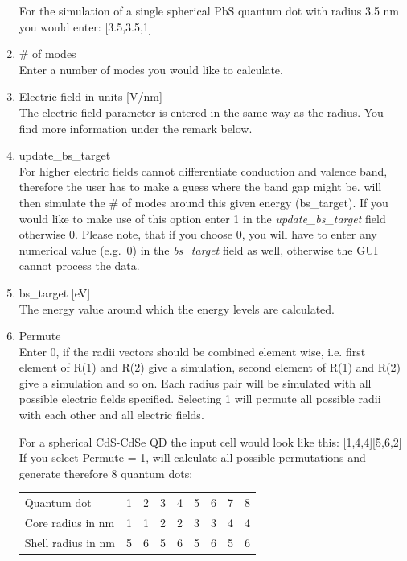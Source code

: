 \begin{enumerate}
							\begin{EXAMPLE}
								For the simulation of a single spherical PbS quantum dot with radius 3.5 nm you would enter: [3.5,3.5,1]
							\end{EXAMPLE}
				\item \# of modes	\\
							Enter a number of modes you would like to calculate.
				\item Electric field in units [V/nm]			\\
							The electric field parameter is entered in the same way as the radius. You find more information under the remark below.
				\item update\_bs\_target	\\
							For higher electric fields \omen cannot differentiate conduction and valence band, therefore the user has to make a guess
							where the band gap might be. \omen will then simulate the \# of modes around this given energy (bs\_target).
							If you would like to make use of this option enter 1 in the {\it update\_bs\_target} field otherwise 0.
							Please note, that if you choose 0, you will have to enter any numerical value (e.g.~0) in the {\it bs\_target} field as well, otherwise
							the \gls{GUI} cannot process the data.
				\item bs\_target [eV]	\\
							The energy value around which the energy levels are calculated.
				\item Permute	\\
							Enter 0, if the radii vectors should be combined element wise, i.e. first element of R(1) and R(2) give a simulation, second element
							of R(1) and R(2) give a simulation and so on. Each radius pair will be simulated with all possible electric fields specified.
							Selecting 1 will permute all possible radii with each other and all electric fields.
							\begin{EXAMPLE}
								For a spherical CdS-CdSe QD the input cell would look like this: [1,4,4][5,6,2]\\
								 If you select Permute = 1, \software will calculate all possible permutations and generate therefore 8 quantum dots: \\
								\newline
								\begin{tabular}{@{}lcccccccc}
									Quantum dot					&	1	&	2	&	3	&	4 &	5	&	6	& 7	&	8	\\
									Core radius	in nm		&	1	& 1 & 2 & 2 & 3	& 3 & 4 & 4	\\
									Shell radius in nm	& 5	& 6 & 5 & 6 & 5 & 6 & 5 & 6	\\
								\end{tabular}
							\end{EXAMPLE}
							

\end{enumerate}
